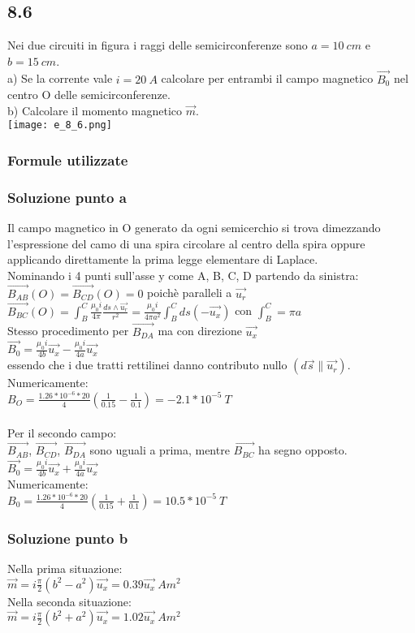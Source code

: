 \documentclass[../../main.tex]{subfiles}
\begin{document}
\subsection*{8.6}
Nei due circuiti in figura i raggi delle semicirconferenze sono $a=10\ cm$ e $b=15\ cm$.\\
a) Se la corrente vale $i = 20\ A$ calcolare per entrambi il campo magnetico $\vec{B_0}$ nel centro O delle semicirconferenze.\\
b) Calcolare il momento magnetico $\vec{m}$.\\
\texttt{[image: e\_8\_6.png]}
\subsubsection*{Formule utilizzate}
\subsubsection*{Soluzione punto a}
Il campo magnetico in O generato da ogni semicerchio si trova dimezzando l'espressione del camo di una spira circolare al centro della spira oppure applicando direttamente la prima legge elementare di Laplace.\\
Nominando i 4 punti sull'asse y come A, B, C, D partendo da sinistra:\\
$\vec{B_{AB}}(O) = \vec{B_{CD}}(O) = 0$ poichè paralleli a $\vec{u_r}$\\
$\vec{B_{BC}}(O) = \int_B^C\frac{\mu_0i}{4\pi}\frac{ds\wedge\vec{u_r}}{r^2}=\frac{\mu_0i}{4\pi a^2}\int_B^Cds (-\vec{u_x})$ con $\int_B^C = \pi a$\\
Stesso procedimento per $\vec{B_{DA}}$ ma con direzione $\vec{u_x}$\\
$\vec{B_0} = \frac{\mu_0 i}{4b}\vec{u_x}-\frac{\mu_0 i}{4a}\vec{u_x}$\\
essendo che i due tratti rettilinei danno contributo nullo $(d\vec{s} \parallel \vec{u_r})$.\\
Numericamente:\\
$B_O = \frac{1.26 * 10^{-6} * 20}{4}\left(\frac{1}{0.15}-\frac{1}{0.1}\right) = -2.1 * 10^{-5}\ T$\\\\
Per il secondo campo:\\
$\vec{B_{AB}}$, $\vec{B_{CD}}$, $\vec{B_{DA}}$ sono uguali a prima, mentre $\vec{B_{BC}}$ ha segno opposto.\\
$\vec{B_0} = \frac{\mu_0 i}{4b}\vec{u_x}+\frac{\mu_0 i}{4a}\vec{u_x}$\\
Numericamente:\\
$B_0 = \frac{1.26 * 10^{-6} * 20}{4}\left(\frac{1}{0.15}+\frac{1}{0.1}\right) = 10.5* 10^{-5}\ T$\\


\subsubsection*{Soluzione punto b}
Nella prima situazione:\\
$\vec{m} = i\frac{\pi}{2}\left(b^2 - a^2\right)\vec{u_x}=0.39\vec{u_x}\ Am^2$\\
Nella seconda situazione:\\
$\vec{m} = i\frac{\pi}{2}\left(b^2 + a^2\right)\vec{u_x}=1.02\vec{u_x}\ Am^2$
\newpage
\end{document}
